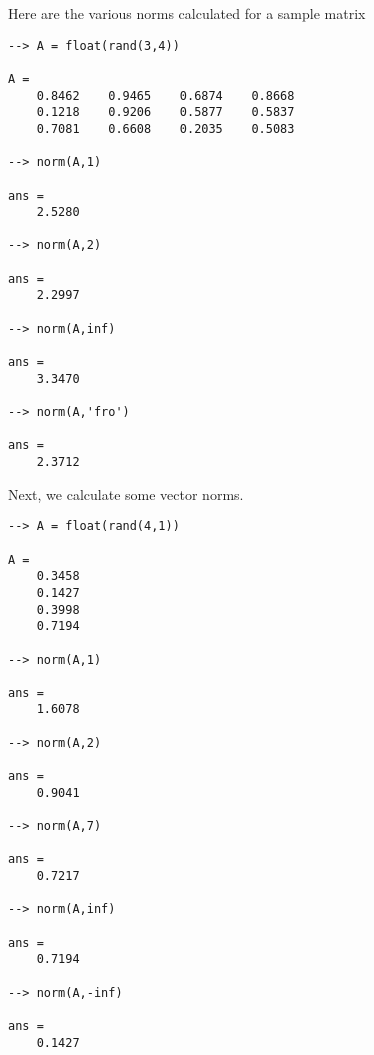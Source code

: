 Here are the various norms calculated for a sample matrix
\begin{verbatim}
--> A = float(rand(3,4))

A = 
    0.8462    0.9465    0.6874    0.8668 
    0.1218    0.9206    0.5877    0.5837 
    0.7081    0.6608    0.2035    0.5083 

--> norm(A,1)

ans = 
    2.5280 

--> norm(A,2)

ans = 
    2.2997 

--> norm(A,inf)

ans = 
    3.3470 

--> norm(A,'fro')

ans = 
    2.3712 
\end{verbatim}
Next, we calculate some vector norms.
\begin{verbatim}
--> A = float(rand(4,1))

A = 
    0.3458 
    0.1427 
    0.3998 
    0.7194 

--> norm(A,1)

ans = 
    1.6078 

--> norm(A,2)

ans = 
    0.9041 

--> norm(A,7)

ans = 
    0.7217 

--> norm(A,inf)

ans = 
    0.7194 

--> norm(A,-inf)

ans = 
    0.1427 
\end{verbatim}
